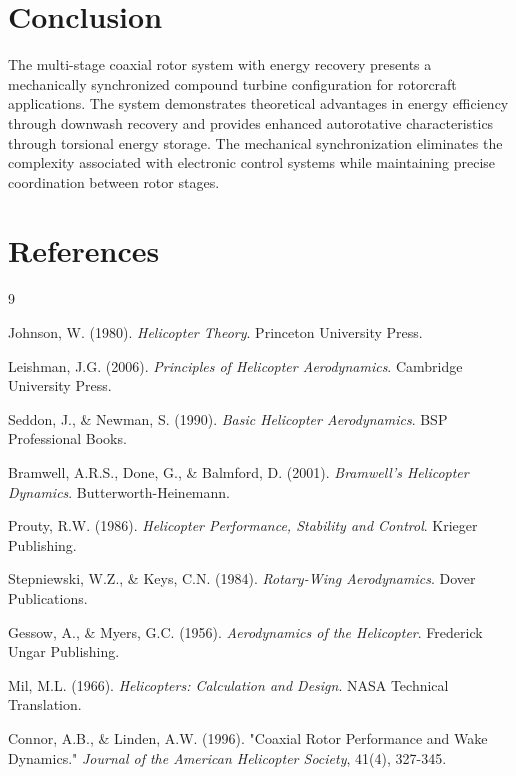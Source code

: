 \documentclass[12pt,a4paper]{article}
\begin{document}
\section{Conclusion}

The multi-stage coaxial rotor system with energy recovery presents a mechanically synchronized compound turbine configuration for rotorcraft applications. The system demonstrates theoretical advantages in energy efficiency through downwash recovery and provides enhanced autorotative characteristics through torsional energy storage. The mechanical synchronization eliminates the complexity associated with electronic control systems while maintaining precise coordination between rotor stages.

\section{References}

\begin{thebibliography}{9}

Johnson, W. (1980). \emph{Helicopter Theory}. Princeton University Press.

Leishman, J.G. (2006). \emph{Principles of Helicopter Aerodynamics}. Cambridge University Press.

Seddon, J., \& Newman, S. (1990). \emph{Basic Helicopter Aerodynamics}. BSP Professional Books.

Bramwell, A.R.S., Done, G., \& Balmford, D. (2001). \emph{Bramwell's Helicopter Dynamics}. Butterworth-Heinemann.

Prouty, R.W. (1986). \emph{Helicopter Performance, Stability and Control}. Krieger Publishing.

Stepniewski, W.Z., \& Keys, C.N. (1984). \emph{Rotary-Wing Aerodynamics}. Dover Publications.

Gessow, A., \& Myers, G.C. (1956). \emph{Aerodynamics of the Helicopter}. Frederick Ungar Publishing.

Mil, M.L. (1966). \emph{Helicopters: Calculation and Design}. NASA Technical Translation.

Connor, A.B., \& Linden, A.W. (1996). "Coaxial Rotor Performance and Wake Dynamics." \emph{Journal of the American Helicopter Society}, 41(4), 327-345.

\end{thebibliography}
\end{document}

